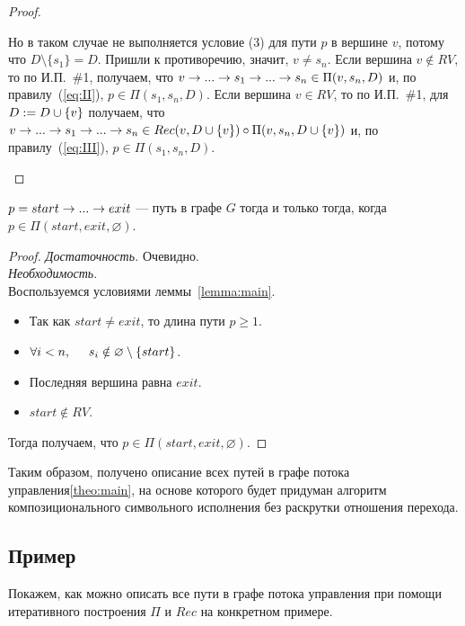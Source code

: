 \begin{proof}
\begin{itemize}
    Но в таком случае не выполняется условие (3) для пути $p$ в вершине $v$, потому что $D \setminus \{s_1\} = D$. Пришли к противоречию, значит, $v \neq s_n$.
        Если вершина $v \notin RV$, то по И.П.~\#1, получаем, что $v \rightarrow ... \rightarrow s_1 \rightarrow ... \rightarrow s_n \in \Pi(v,s_n,D)$ и, по правилу~(\ref{eq:II}),
        $p \in \Pi(s_1, s_n, D)$.
        Если вершина $v \in RV$, то по И.П.~\#1, для $D := D \cup \{v\}$ получаем, что $v \rightarrow ... \rightarrow s_1 \rightarrow ... \rightarrow s_n \in Rec(v, D \cup \{v\}) \circ \Pi(v,s_n,D \cup \{v\})$ и, по правилу~(\ref{eq:III}), $p \in \Pi(s_1,s_n,D)$.
\end{itemize}
\end{proof}

\begin{thrm}
\label{theo:main}
$p = start \rightarrow ... \rightarrow exit$ --- путь в графе $G$ тогда и только тогда, когда $p \in \Pi(start,exit,\varnothing)$. 
\end{thrm}

\begin{proof}
\emph{Достаточность.} Очевидно. \\
\emph{Необходимость.}\\
Воспользуемся условиями леммы~\ref{lemma:main}.
\begin{itemize}
    \item Так как $start \neq exit$, то длина пути $p \geq 1$.
    \item $\forall i < n, \hspace{5mm} s_i \notin \varnothing \setminus \{start\}$.
    \item Последняя вершина равна $exit$.
    \item $start \notin RV$.
\end{itemize}
Тогда получаем, что $p \in \Pi(start,exit,\varnothing)$.
\end{proof}

Таким образом, получено описание всех путей в графе потока управления\ref{theo:main}, на основе которого будет придуман алгоритм композиционального символьного исполнения без раскрутки отношения перехода.


\subsection{Пример}
Покажем, как можно описать все пути в графе потока управления при помощи итеративного построения $\Pi$ и $Rec$ на конкретном примере.

